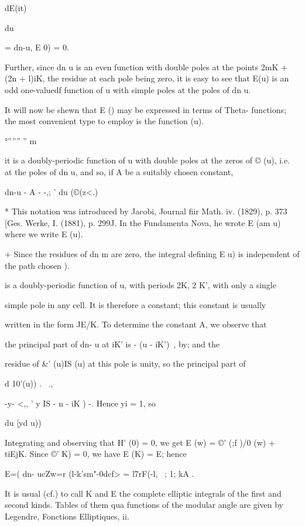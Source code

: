 dE(it)

du

= dn-u, E 0) = 0.

Further, since dn u is an even function with double poles at the
points 2mK + (2n + l)iK, the residue at each pole being zero, it is
easy to see that E(u) is an odd one-valuedf function of u with simple
poles at the poles of dn u.

It will now be shewn that E () may be expressed in terms of Theta-
functions; the most convenient type to employ is the function (u).

 °'''''' '' m %

it is a doubly-periodic function of u with double poles at the zeros
of © (u), i.e. at the poles of dn u, and so, if A be a suitably chosen
constant,

dn-u - A - -,; ' du (©(z<.)

* This notation was introduced by Jacobi, Journal fiir Math. iv.
(1829), p. 373 [Ges. Werke, I. (1881), p. 299J. In the Fundamenta
Nova, he wrote E (am u) where we write E (u).

+ Since the residues of dn m are zero, the integral defining E u) is
independent of the path chosen ).

%
%

is a doubly-periodic function of u, with periods 2K, 2 K', with only a
single

simple pole in any cell. It is therefore a constant; this constant is
usually

written in the form JE/K. To determine the constant A, we observe that

the principal part of dn- u at iK' is - (u - iK')~, by; and
the

residue of \&' (u)IS (u) at this pole is unity, so the principal part
of

d 10'(u)) . \ .,

-y- <,, ' y IS - n - iK ) -. Hence yi = 1, so

du [yd u))

Integrating and observing that H' (0) = 0, we get E (w) = ©' (;f )/0
(w) + tiEjK. Since ©' K) = 0, we have E (K) = E; hence

E=( dn- ucZw=r (l-k'sm"-0dcf> = l7rF(-l, ~; 1; kA .

It is usual (cf.) to call K and E the complete elliptic
integrals of the first and second kinds. Tables of them qua functions
of the modular angle are given by Legendre, Fonctions Elliptiques, ii.

